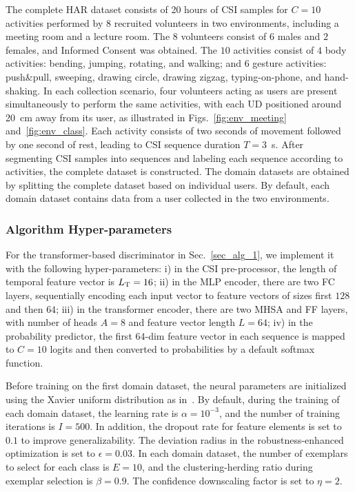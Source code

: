The complete HAR dataset consists of 20 hours of CSI samples for $C=10$ activities performed by $8$ recruited volunteers in two environments, including a meeting room and a lecture room.
The $8$ volunteers consist of $6$ males and $2$ females, and Informed Consent was obtained.
The $10$ activities consist of $4$ body activities: bending, jumping, rotating, and walking; and $6$ gesture activities: push\&pull, sweeping, drawing circle, drawing zigzag, typing-on-phone, and hand-shaking.
In each collection scenario, four volunteers acting as users are present simultaneously to perform the same activities, with each UD positioned around 20\!~cm away from its user, as illustrated in Figs.~\ref{fig:env_meeting} and~\ref{fig:env_class}.
Each activity consists of two seconds of movement followed by one second of rest, leading to CSI sequence duration $T\!=\!3$~\!s.
After segmenting CSI samples into sequences and labeling each sequence according to activities, the complete dataset is constructed.
The domain datasets are obtained by splitting the complete dataset based on individual users.
By default, each domain dataset contains data from a user collected in the two environments.



\subsubsection{Algorithm Hyper-parameters}
For the transformer-based discriminator in Sec.~\ref{sec_alg_1}, we implement it with the following hyper-parameters:
i) in the CSI pre-processor, the length of temporal feature vector is $L_{\mathrm{T}} = 16$; 
ii) in the MLP encoder, there are two FC layers, sequentially encoding each input vector to feature vectors of sizes first $128$ and then $64$;
iii) in the transformer encoder, there are two MHSA and FF layers, with number of heads $A=8$ and feature vector length $L=64$;
iv) in the probability predictor, the first $64$-dim feature vector in each sequence is mapped to $C=10$ logits and then converted to probabilities by a default softmax function.

Before training on the first domain dataset, the neural parameters are initialized using the Xavier uniform distribution as in~\cite{Glorot10ICAIS_Understanding}.
By default, during the training of each domain dataset, the learning rate is $\alpha=10^{-3}$, and the number of training iterations is $I=500$. 
In addition, the dropout rate for feature elements is set to $0.1$ to improve generalizability.
The deviation radius in the robustness-enhanced optimization is set to $\epsilon=0.03$.
In each domain dataset, the number of exemplars to select for each class is $E=10$, and the clustering-herding ratio during exemplar selection is $\beta=0.9$.
The confidence downscaling factor is set to $\eta=2$.

